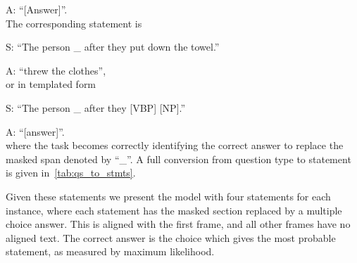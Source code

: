 A: ``[Answer]''.\\
The corresponding statement is

S: ``The person \_ after they put down the towel.''

A: ``threw the clothes'',\\
or in templated form

S: ``The person \_ after they [VBP] [NP].''

A: ``[answer]''.\\
where the task becomes correctly identifying the correct answer to replace the
masked span denoted by ``\_''. A full conversion from question type to
statement is given in~\cref{tab:qs_to_stmts}.

Given these statements we present the model with four statements for each
instance, where each statement has the masked section replaced by a multiple
choice answer. This is aligned with the first frame, and all other frames have
no aligned text. The correct answer is the choice which gives the most probable
statement, as measured by maximum likelihood.

